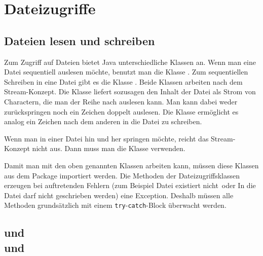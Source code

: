\chapter{Dateizugriffe}
\renewcommand{\chaptertitle}{Dateizugriffe}

\lehead[]{\normalfont\sffamily\hspace*{-2.00cm}\textcolor{white}{\colorbox{lightblue}{\makebox[1.60cm][r]{\thechapter}}}\hspace{0.17cm}\textcolor{lightblue}{\chaptertitle}}
\rohead[]{\textcolor{lightblue}{\chaptertitle}\normalfont\sffamily\hspace*{0.17cm}\textcolor{white}{\colorbox{lightblue}{\makebox[1.60cm][l]{\thechapter}}}\hspace{-2.00cm}}
\rehead[]{\textcolor{lightblue}{AvHG, Inf, My}}
\lohead[]{\textcolor{lightblue}{AvHG, Inf, My}}

\lstset{style=myJava}

\section{Dateien lesen und schreiben}

Zum Zugriff auf Dateien bietet Java unterschiedliche Klassen an. Wenn man eine
Datei sequentiell auslesen möchte, benutzt man die Klasse
. Zum sequentiellen Schreiben in eine Datei gibt es die
Klasse . Beide Klassen arbeiten nach dem
Stream-Konzept. Die Klasse  liefert sozusagen den
Inhalt der Datei als Strom von Charactern, die man der Reihe nach auslesen
kann. Man kann dabei weder zurückspringen noch ein Zeichen doppelt auslesen.
Die Klasse  ermöglicht es analog ein Zeichen nach dem
anderen in die Datei zu schreiben.

Wenn man in einer Datei hin und her springen möchte, reicht das Stream-Konzept
nicht aus. Dann muss man die Klasse  verwenden.

Damit man mit den oben genannten Klassen arbeiten kann, müssen diese Klassen
aus dem Package  importiert werden. Die Methoden der
Dateizugriffsklassen erzeugen bei auftretenden Fehlern (zum Beispiel \glqq Datei
existiert nicht\grqq\ oder \glqq In die Datei darf nicht geschrieben
werden\grqq ) eine Exception. Deshalb müssen alle Methoden grundsätzlich mit
einem \lstinline|try|-\lstinline|catch|-Block überwacht werden.


\section{ und \\
 und }

